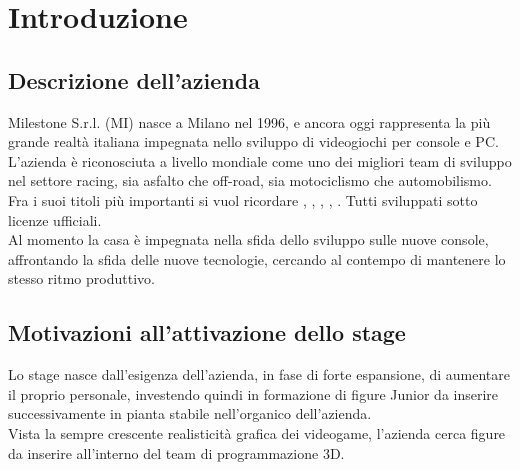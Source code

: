 
\chapter{Introduzione}
\label{cap:introduzione}

\section{Descrizione dell'azienda}

Milestone S.r.l. (MI) nasce a Milano nel 1996, e ancora oggi rappresenta la più grande realtà italiana impegnata nello sviluppo di videogiochi per console e PC. L'azienda è riconosciuta a livello mondiale come uno dei migliori team di sviluppo nel settore racing, sia asfalto che off-road, sia motociclismo che automobilismo.\\

Fra i suoi titoli più importanti si vuol ricordare , , , , . Tutti sviluppati sotto licenze ufficiali.\\

Al momento la casa è impegnata nella sfida dello sviluppo sulle nuove console, affrontando la sfida delle nuove tecnologie, cercando al contempo di mantenere lo stesso ritmo produttivo. 

\section{Motivazioni all'attivazione dello stage}

Lo stage nasce dall'esigenza dell'azienda, in fase di forte espansione, di aumentare il proprio personale, investendo quindi in formazione di figure Junior da inserire successivamente in pianta stabile nell'organico dell'azienda.\\

Vista la sempre crescente realisticità grafica dei videogame, l'azienda cerca figure da inserire all'interno del team di programmazione 3D.

